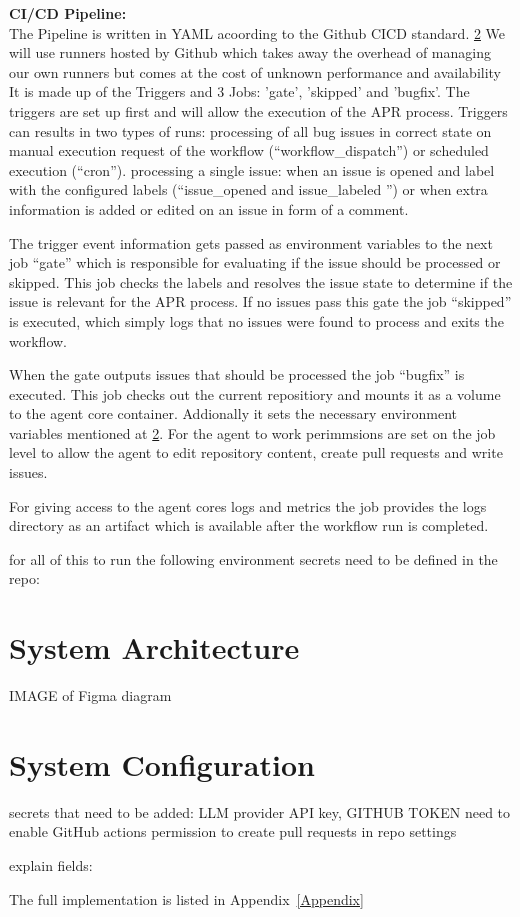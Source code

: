 \textbf{CI/CD Pipeline:}\\
The Pipeline is written in YAML acoording to the Github CICD standard. \ref{}
We will use runners hosted by Github which takes away the overhead of managing our own runners but comes at the cost of unknown performance and availability
It is made up of the Triggers and 3 Jobs: 'gate', 'skipped' and 'bugfix'.
The triggers are set up first and will allow the execution of the APR process.
Triggers can results in two types of runs:
processing of all bug issues in correct state on manual execution request of the workflow (``workflow\_dispatch'') or scheduled execution (``cron'').
processing a single issue: when an issue is opened and label with the configured labels (``issue\_opened and issue\_labeled '') or when extra information is added or edited on an issue in form of a comment.

The trigger  event information gets passed as environment variables to the next job
``gate'' which is responsible for evaluating if the issue should be processed or skipped. This job checks the labels and resolves the issue state to determine if the issue is relevant for the APR process.
If no issues pass this gate the job ``skipped'' is executed, which simply logs that no issues were found to process and exits the workflow.

When the gate outputs issues that should be processed the job ``bugfix'' is executed. This job checks out the current repositiory and mounts it as a volume to the agent core container. Addionally it sets the necessary environment variables mentioned at \ref{}. For the agent to work perimmsions are set on the job level to allow the agent to edit repository content, create pull requests and write issues.

For giving access to the agent cores logs and metrics the job provides the logs directory as an artifact which is available after the workflow run is completed.


for all of this to run the following environment secrets need to be defined in the repo:


\section{System Architecture}

IMAGE of Figma diagram



\section{System Configuration}




secrets that need to be added:
LLM provider API key, GITHUB TOKEN
need to enable GitHub actions permission to create pull requests in repo settings

explain fields:

The full implementation is listed in Appendix~\ref{Appendix}